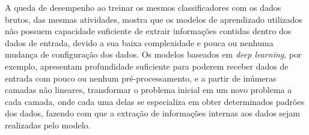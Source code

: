 A queda de desempenho ao treinar os mesmos classificadores com os dados brutos, das mesmas atividades, mostra que os modelos de aprendizado utilizados não possuem capacidade suficiente de extrair informações contidas dentro dos dados de entrada, devido a sua baixa complexidade e pouca ou nenhuma mudança de configuração dos dados. Os modelos baseados em \textit{deep learning}, por exemplo, apresentam profundidade suficiente para poderem receber dados de entrada com pouco ou nenhum pré-processamento, e a partir de inúmeras camadas não lineares, transformar o problema inicial em um novo problema a cada camada, onde cada uma delas se especializa em obter determinados padrões dos dados, fazendo com que a extração de informações internas aos dados sejam realizadas pelo modelo.





